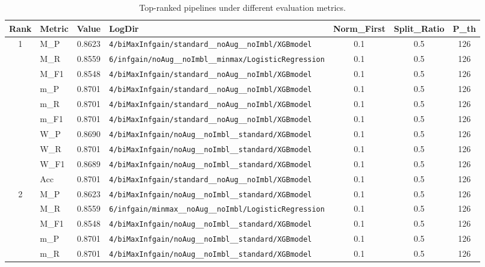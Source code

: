 \begin{table}[htbp]
\caption{Top-ranked pipelines under different evaluation metrics.}
\label{tab:rank_metric_vertical}
\centering
\small
\setlength{\tabcolsep}{4pt}
\begin{tabular}{|c|l|c|>{\ttfamily\footnotesize}p{7.2cm}|c|c|c|}
\hline
Rank & Metric & Value & LogDir & Norm\_First & Split\_Ratio & P\_th \\
\hline
\multirow{10}{*}{1} & M\_P & 0.8623 & \texttt{4/biMaxInfgain/standard\_\_noAug\_\_noImbl/XGBmodel} & 0.1 & 0.5  & 126 \\ 
 & M\_R & 0.8559 & \texttt{6/infgain/noAug\_\_noImbl\_\_minmax/LogisticRegression} & 0.1 & 0.5  & 126 \\ 
 & M\_F1 & 0.8548 & \texttt{4/biMaxInfgain/standard\_\_noAug\_\_noImbl/XGBmodel} & 0.1 & 0.5  & 126 \\ 
 & m\_P & 0.8701 & \texttt{4/biMaxInfgain/standard\_\_noAug\_\_noImbl/XGBmodel} & 0.1 & 0.5  & 126 \\ 
 & m\_R & 0.8701 & \texttt{4/biMaxInfgain/standard\_\_noAug\_\_noImbl/XGBmodel} & 0.1 & 0.5  & 126 \\ 
 & m\_F1 & 0.8701 & \texttt{4/biMaxInfgain/standard\_\_noAug\_\_noImbl/XGBmodel} & 0.1 & 0.5  & 126 \\ 
 & W\_P & 0.8690 & \texttt{4/biMaxInfgain/noAug\_\_noImbl\_\_standard/XGBmodel} & 0.1 & 0.5  & 126 \\ 
 & W\_R & 0.8701 & \texttt{4/biMaxInfgain/noAug\_\_noImbl\_\_standard/XGBmodel} & 0.1 & 0.5  & 126 \\ 
 & W\_F1 & 0.8689 & \texttt{4/biMaxInfgain/noAug\_\_noImbl\_\_standard/XGBmodel} & 0.1 & 0.5  & 126 \\ 
 & Acc & 0.8701 & \texttt{4/biMaxInfgain/standard\_\_noAug\_\_noImbl/XGBmodel} & 0.1 & 0.5  & 126 \\ 
\hline
\multirow{10}{*}{2} & M\_P & 0.8623 & \texttt{4/biMaxInfgain/noAug\_\_noImbl\_\_standard/XGBmodel} & 0.1 & 0.5  & 126 \\ 
 & M\_R & 0.8559 & \texttt{6/infgain/minmax\_\_noAug\_\_noImbl/LogisticRegression} & 0.1 & 0.5  & 126 \\ 
 & M\_F1 & 0.8548 & \texttt{4/biMaxInfgain/noAug\_\_noImbl\_\_standard/XGBmodel} & 0.1 & 0.5  & 126 \\ 
 & m\_P & 0.8701 & \texttt{4/biMaxInfgain/noAug\_\_noImbl\_\_standard/XGBmodel} & 0.1 & 0.5  & 126 \\ 
 & m\_R & 0.8701 & \texttt{4/biMaxInfgain/noAug\_\_noImbl\_\_standard/XGBmodel} & 0.1 & 0.5  & 126 \\ 

\end{tabular}
\end{table}
